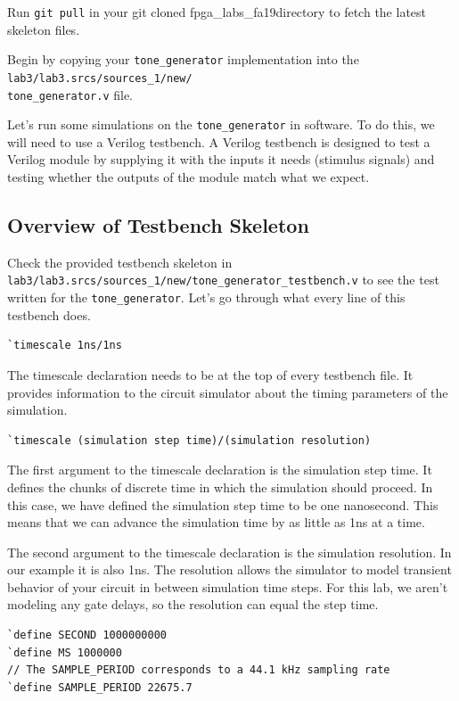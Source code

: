 \documentclass[11pt]{article}
\newcommand{\RepoRootPath}{fpga\_labs\_fa19}
\begin{document}
Run \verb|git pull| in your git cloned \RepoRootPath directory to fetch the latest skeleton files.

Begin by copying your \verb|tone_generator| implementation into the \verb|lab3/lab3.srcs/sources_1/new/| \\ \verb|tone_generator.v| file.

Let's run some simulations on the \verb|tone_generator| in software. To do this, we will need to use a Verilog testbench. A Verilog testbench is designed to test a Verilog module by supplying it with the inputs it needs (stimulus signals) and testing whether the outputs of the module match what we expect.

\subsection{Overview of Testbench Skeleton}
Check the provided testbench skeleton in \verb|lab3/lab3.srcs/sources_1/new/tone_generator_testbench.v| to see the test written for the \verb|tone_generator|. Let's go through what every line of this testbench does.

\begin{verbatim}
`timescale 1ns/1ns
\end{verbatim}

The timescale declaration needs to be at the top of every testbench file. It provides information to the circuit simulator about the timing parameters of the simulation.
\begin{verbatim}
`timescale (simulation step time)/(simulation resolution)
\end{verbatim}

The first argument to the timescale declaration is the simulation step time. It defines the chunks of discrete time in which the simulation should proceed. In this case, we have defined the simulation step time to be one nanosecond. This means that we can advance the simulation time by as little as 1ns at a time.

The second argument to the timescale declaration is the simulation resolution. In our example it is also 1ns. The resolution allows the simulator to model transient behavior of your circuit in between simulation time steps. For this lab, we aren't modeling any gate delays, so the resolution can equal the step time.

\begin{verbatim}
`define SECOND 1000000000
`define MS 1000000
// The SAMPLE_PERIOD corresponds to a 44.1 kHz sampling rate
`define SAMPLE_PERIOD 22675.7
\end{verbatim}
\end{document}
